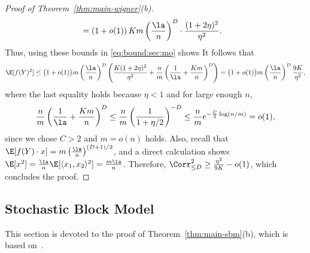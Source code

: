 \documentclass[11pt]{article}
\begin{document}
\begin{proof}[Proof of Theorem~\ref{thm:main-wigner}(b)]
\[\begin{split}
&= \left(1+o(1)\right)Km\left(\frac{\la}{n}\right)^{D}\cdot  \frac{(1+2\eta)^2}{\eta^2}.
\end{split}
\]
Thus, using these bounds in \eqref{eq:bound:sec:mo} shows 
It follows that
\[
\E[f(Y)^2]\leq \big(1+o(1)\big)m\left(\frac{\la}{n}\right)^D\left(\frac{K(1+2\eta)^2}{\eta^2}+\frac{n}{m}\left(\frac{1}{\la}+\frac{Km}{n}\right)^D\right)=\big(1+o(1)\big)m\left(\frac{\la}{n}\right)^D\frac{9K}{\eta^2},
\]
where the last equality holds because $\eta<1$ and for large enough $n$,
\[
\frac{n}{m}\left(\frac{1}{\la}+\frac{Km}{n}\right)^D\leq \frac{n}{m}\left(\frac{1}{1+\eta/2}\right)^{-D}\leq \frac{n}{m}e^{-\frac{C}{2}\log(n/m)}= o(1),
\]
since we chose $C>2$ and $m=o(n)$ holds.
Also, recall that $\E[f(Y)\cdot x]=m\left(\frac{\la}{n}\right)^{(D+1)/2}$, and a direct calculation shows $\E[x^2]=\frac{\la}{n}\E[\langle x_1,x_2\rangle^2]=\frac{m\la}{n}$. Therefore, $\Corr_{\leq D}^2\geq \frac{\eta^2}{9K}-o(1)$, which concludes the proof.
\end{proof}


\subsection{Stochastic Block Model}

This section is devoted to the proof of Theorem~\ref{thm:main-sbm}(b), which is based on~\cite{HS-bayesian}.
\end{document}
